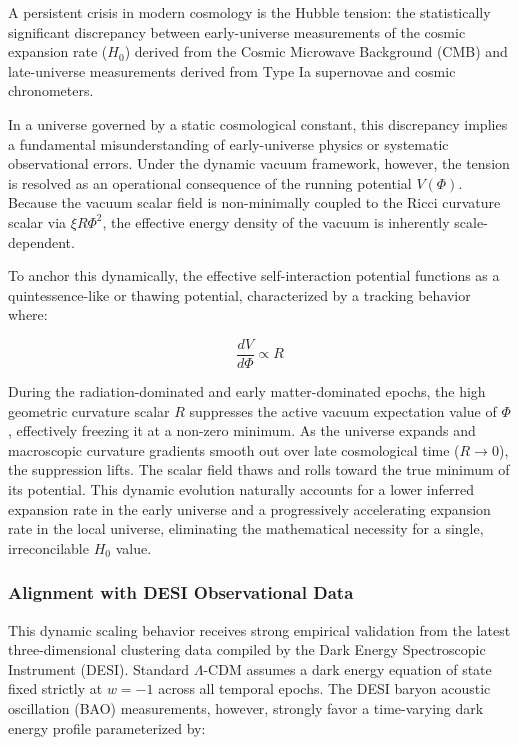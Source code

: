 A persistent crisis in modern cosmology is the Hubble tension: the
statistically significant discrepancy between early-universe
measurements of the cosmic expansion rate (\(H_0\)) derived from the
Cosmic Microwave Background (CMB) and late-universe measurements derived
from Type Ia supernovae and cosmic chronometers.

In a universe governed by a static cosmological constant, this
discrepancy implies a fundamental misunderstanding of early-universe
physics or systematic observational errors. Under the dynamic vacuum
framework, however, the tension is resolved as an operational
consequence of the running potential \(V(\Phi)\). Because the vacuum
scalar field is non-minimally coupled to the Ricci curvature scalar via
\(\xi R \Phi^2\), the effective energy density of the vacuum is
inherently scale-dependent.

To anchor this dynamically, the effective self-interaction potential
functions as a quintessence-like or thawing potential, characterized by
a tracking behavior where:

\[\frac{dV}{d\Phi} \propto R\]

During the radiation-dominated and early matter-dominated epochs, the
high geometric curvature scalar \(R\) suppresses the active vacuum
expectation value of \(\Phi\), effectively freezing it at a non-zero
minimum. As the universe expands and macroscopic curvature gradients
smooth out over late cosmological time (\(R \to 0\)), the suppression
lifts. The scalar field thaws and rolls toward the true minimum of its
potential. This dynamic evolution naturally accounts for a lower
inferred expansion rate in the early universe and a progressively
accelerating expansion rate in the local universe, eliminating the
mathematical necessity for a single, irreconcilable \(H_0\) value.

\subsubsection{Alignment with DESI Observational
Data}\label{alignment-with-desi-observational-data}

This dynamic scaling behavior receives strong empirical validation from
the latest three-dimensional clustering data compiled by the Dark Energy
Spectroscopic Instrument (DESI). Standard \(\Lambda\)-CDM assumes a dark
energy equation of state fixed strictly at \(w = -1\) across all
temporal epochs. The DESI baryon acoustic oscillation (BAO)
measurements, however, strongly favor a time-varying dark energy profile
parameterized by:

